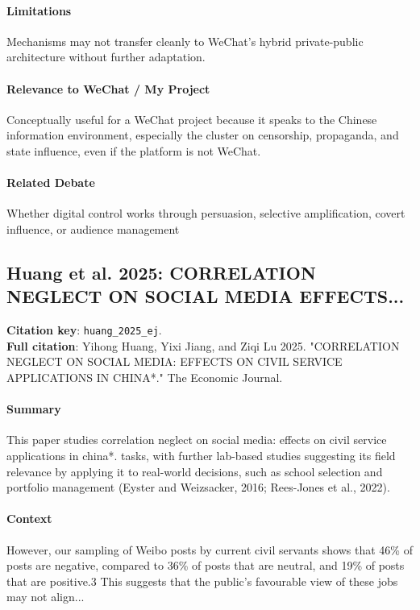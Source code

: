 \documentclass[12pt]{article}
\begin{document}
\paragraph{Limitations} Mechanisms may not transfer cleanly to WeChat's hybrid private-public architecture without further adaptation.

\paragraph{Relevance to WeChat / My Project} Conceptually useful for a WeChat project because it speaks to the Chinese information environment, especially the cluster on censorship, propaganda, and state influence, even if the platform is not WeChat.

\paragraph{Related Debate} Whether digital control works through persuasion, selective amplification, covert influence, or audience management


\subsection{Huang et al. 2025: CORRELATION NEGLECT ON SOCIAL MEDIA EFFECTS...}
\textbf{Citation key}: \texttt{huang\_2025\_ej}.\\
\textbf{Full citation}: Yihong Huang, Yixi Jiang, and Ziqi Lu 2025. "CORRELATION NEGLECT ON SOCIAL MEDIA: EFFECTS ON CIVIL SERVICE APPLICATIONS IN CHINA*." The Economic Journal.

\paragraph{Summary} This paper studies correlation neglect on social media: effects on civil service applications in china*. tasks, with further lab-based studies suggesting its field relevance by applying it to real-world decisions, such as school selection and portfolio management (Eyster and Weizsacker, 2016; Rees-Jones et al., 2022).

\paragraph{Context} However, our sampling of Weibo posts by current civil servants shows that 46\% of posts are negative, compared to 36\% of posts that are neutral, and 19\% of posts that are positive.3 This suggests that the public's favourable view of these jobs may not align...
\end{document}
